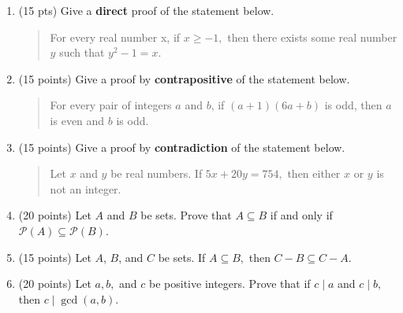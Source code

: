 \documentclass[11pt]{article}
\begin{document}
\newpage
\begin{enumerate}
\item (15 pts) Give a \textbf{direct} proof of the statement below.
\begin{quote} For every real number x, if $x \geq -1,$ then there exists some real number $y$ such that $y^2-1=x.$ \end{quote}

\newpage

\item (15 points) Give a proof by \textbf{contrapositive} of the statement below.

\begin{quote} For every pair of integers $a$ and $b$, if $(a+1)(6a+b)$ is odd, then $a$ is even and $b$ is odd. \end{quote}
\vfill
\newpage
\item (15 points) Give a proof by \textbf{contradiction} of the statement below.
\begin{quote} Let $x$ and $y$ be real numbers. If $5x + 20y=754,$ then either $x$ or $y$ is not an integer. \end{quote}
\newpage
\item (20 points) Let $A$ and $B$ be sets. Prove that $A \subseteq B$ if and only if $\mathcal{P}(A) \subseteq \mathcal{P}(B).$
\newpage
\item (15 points) Let $A$, $B$, and $C$ be sets. If $A \subseteq B,$ then $C-B \subseteq C-A.$
\newpage
\item (20 points) Let $a,b,$ and $c$ be positive integers. Prove that if $c \mid a$ and $c \mid b,$ then $c \mid \gcd(a,b).$
\newpage
\end{enumerate}
\end{document}
